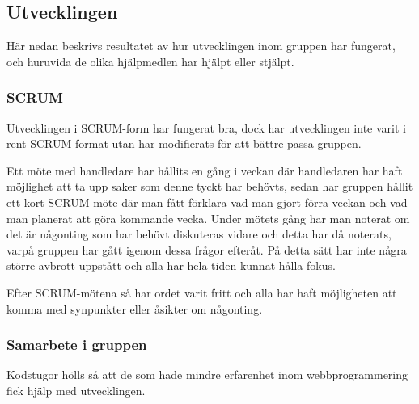 
\subsection{Utvecklingen}
Här nedan beskrivs resultatet av hur utvecklingen inom gruppen har fungerat,
och huruvida de olika hjälpmedlen har hjälpt eller stjälpt.

\subsubsection{SCRUM}
Utvecklingen i SCRUM-form har fungerat bra,
dock har utvecklingen inte varit i rent SCRUM-format utan har modifierats för att bättre passa gruppen.

Ett möte med handledare har hållits en gång i veckan där handledaren har haft möjlighet att ta upp saker som denne tyckt har behövts,
sedan har gruppen hållit ett kort SCRUM-möte där man fått förklara vad man gjort förra veckan och vad man planerat
att göra kommande vecka. Under mötets gång har man noterat om det är någonting som har behövt diskuteras
vidare och detta har då noterats, varpå gruppen har gått igenom dessa frågor efteråt. På detta sätt har inte några större avbrott uppstått och alla har hela tiden kunnat hålla fokus.

Efter SCRUM-mötena så har ordet varit fritt och alla har haft möjligheten att komma med synpunkter eller åsikter om någonting.

\subsubsection{Samarbete i gruppen}
Kodstugor hölls så att de som hade mindre erfarenhet inom webbprogrammering fick hjälp med utvecklingen.


